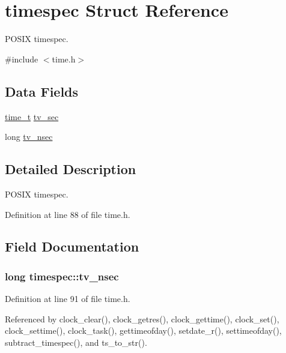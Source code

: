 \hypertarget{structtimespec}{}\section{timespec Struct Reference}
\label{structtimespec}


P\+O\+S\+IX timespec.  




{\ttfamily \#include $<$time.\+h$>$}

\subsection*{Data Fields}
\begin{DoxyCompactItemize}
\item 
\hyperlink{time_8h_a3346b04b0420b32ccf6b706551b70762}{time\+\_\+t} \hyperlink{structtimespec_afc3302668d7cb5952f590da69fdd4955}{tv\+\_\+sec}
\item 
long \hyperlink{structtimespec_ae3c7510dafa8cbcaede866ed13c99683}{tv\+\_\+nsec}
\end{DoxyCompactItemize}


\subsection{Detailed Description}
P\+O\+S\+IX timespec. 

Definition at line 88 of file time.\+h.



\subsection{Field Documentation}
\subsubsection[{\texorpdfstring{tv\+\_\+nsec}{tv_nsec}}]{\setlength{\rightskip}{0pt plus 5cm}long timespec\+::tv\+\_\+nsec}\hypertarget{structtimespec_ae3c7510dafa8cbcaede866ed13c99683}{}\label{structtimespec_ae3c7510dafa8cbcaede866ed13c99683}


Definition at line 91 of file time.\+h.



Referenced by clock\+\_\+clear(), clock\+\_\+getres(), clock\+\_\+gettime(), clock\+\_\+set(), clock\+\_\+settime(), clock\+\_\+task(), gettimeofday(), setdate\+\_\+r(), settimeofday(), subtract\+\_\+timespec(), and ts\+\_\+to\+\_\+str().

